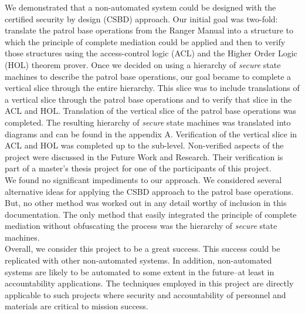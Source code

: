 We demonstrated that a non-automated system could be designed with the certified security
by design (CSBD) approach.  Our initial goal was two-fold: translate the patrol base operations
from the Ranger Manual into a structure to which the principle of complete mediation could be
applied and then to verify those structures using the access-control logic (ACL) and the Higher
Order Logic (HOL) theorem prover.  Once we decided on using a hierarchy of \emph{secure} state machines
to describe the patrol base operations, our goal became to complete a vertical slice through the
entire hierarchy.  This slice was to include translations of a vertical slice through the patrol
base operations and to verify that slice in the ACL and HOL.  Translation of the vertical slice of
the patrol base operations was completed.  The resulting hierarchy of \emph{secure} state machines was
translated into diagrams and can be found in the appendix A.  Verification of the vertical slice
in ACL and HOL was completed up to the sub-level.  Non-verified aspects of the project were
discussed in the Future Work and Research.  Their verification is part of a master's thesis
project for one of the participants of this project.  \\

We found no significant impediments to our approach.  We considered several alternative ideas
for applying the CSBD approach to the patrol base operations.  But, no other method was worked
out in any detail worthy of inclusion in this documentation.  The only method that easily
integrated the principle of complete mediation without obfuscating the process was the hierarchy
of \emph{secure} state machines.\\

Overall, we consider this project to be a great success.  This success could be replicated with other non-automated systems.  In addition, non-automated systems are likely to be automated to some extent in the future--at least in accountability applications.  The techniques employed in this project are directly applicable to such projects where security and accountability of personnel and materials are critical to mission success.  

